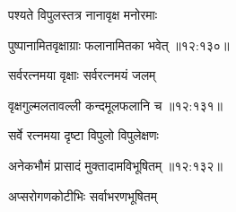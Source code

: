 {\devanagarifont पश्यते विपुलस्तत्र नानावृक्ष मनोरमाः \thinspace{\dandab} \dontdisplaylinenum }%


{\devanagarifont पुष्पानामितवृक्षाग्राः फलानामितका भवेत् {॥१२:१३०॥} \veg\dontdisplaylinenum }%

{\devanagarifont सर्वरत्नमया वृक्षाः सर्वरत्नमयं जलम् \thinspace{\dandab} \dontdisplaylinenum }%


{\devanagarifont वृक्षगुल्मलतावल्ली कन्दमूलफलानि च {॥१२:१३१॥} \veg\dontdisplaylinenum }%

{\devanagarifont सर्वे रत्नमया दृष्टा विपुलो विपुलेक्षणः \thinspace{\dandab} \dontdisplaylinenum }%


{\devanagarifont अनेकभौमं प्रासादं मुक्तादामविभूषितम् {॥१२:१३२॥} \veg\dontdisplaylinenum }%

{\devanagarifont अप्सरोगणकोटीभिः सर्वाभरणभूषितम् \thinspace{\dandab} \dontdisplaylinenum }%

